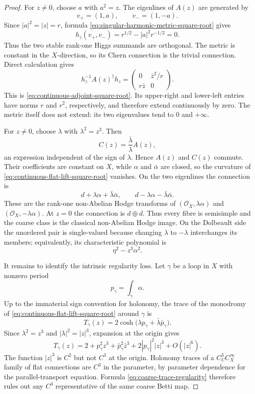 \documentclass[11pt,reqno]{amsart}
\theoremstyle{definition}
\theoremstyle{remark}
\begin{document}
\begin{proof}
For $z\ne0$, choose $a$ with $a^2=z$.  The eigenlines of $A(z)$ are generated by
\[
  v_+=(1,a),
  \qquad
  v_-=(1,-a).
\]
Since $|a|^2=|z|=r$, formula \eqref{eq:singular-harmonic-metric-square-root} gives
\[
  h_z(v_+,v_-)=r^{1/2}-|a|^2r^{-1/2}=0.
\]
Thus the two stable rank-one Higgs summands are orthogonal.  The metric is constant in the $X$-direction, so its Chern connection is the trivial connection.  Direct calculation gives
\[
  h_z^{-1}A(z)^\dagger h_z
  =
  \begin{pmatrix}
    0&\bar z^2/r\\
    r\bar z&0
  \end{pmatrix}.
\]
This is \eqref{eq:continuous-adjoint-square-root}.  Its upper-right and lower-left entries have norms $r$ and $r^2$, respectively, and therefore extend continuously by zero.  The metric itself does not extend: its two eigenvalues tend to $0$ and $+\infty$.

For $z\ne0$, choose $\lambda$ with $\lambda^2=z^3$.  Then
\[
  C(z)=\frac{\bar\lambda}{\lambda}A(z),
\]
an expression independent of the sign of $\lambda$.  Hence $A(z)$ and $C(z)$ commute.  Their coefficients are constant on $X$, while $\alpha$ and $\bar\alpha$ are closed, so the curvature of \eqref{eq:continuous-flat-lift-square-root} vanishes.  On the two eigenlines the connection is
\[
  d+\lambda\alpha+\bar\lambda\bar\alpha,
  \qquad
  d-\lambda\alpha-\bar\lambda\bar\alpha.
\]
These are the rank-one non-Abelian Hodge transforms of $(\mathcal O_X,\lambda\alpha)$ and $(\mathcal O_X,-\lambda\alpha)$.  At $z=0$ the connection is $d\oplus d$.  Thus every fibre is semisimple and the coarse class is the classical non-Abelian Hodge image.  On the Dolbeault side the unordered pair is single-valued because changing $\lambda$ to $-\lambda$ interchanges its members; equivalently, its characteristic polynomial is
\[
  \eta^2-z^3\alpha^2.
\]

It remains to identify the intrinsic regularity loss.  Let $\gamma$ be a loop in $X$ with nonzero period
\[
  p_\gamma=\int_\gamma\alpha.
\]
Up to the immaterial sign convention for holonomy, the trace of the monodromy of \eqref{eq:continuous-flat-lift-square-root} around $\gamma$ is
\[
  T_\gamma(z)
  =2\cosh\bigl(\lambda p_\gamma+\bar\lambda\bar p_\gamma\bigr).
\]
Since $\lambda^2=z^3$ and $|\lambda|^2=|z|^3$, expansion at the origin gives
\begin{equation}\label{eq:coarse-trace-regularity}
  T_\gamma(z)
  =2+p_\gamma^2z^3+\bar p_\gamma^2\bar z^3
   +2|p_\gamma|^2|z|^3+O(|z|^6).
\end{equation}
The function $|z|^3$ is $C^2$ but not $C^3$ at the origin.  Holonomy traces of a $C^3_UC^\infty_X$ family of flat connections are $C^3$ in the parameter, by parameter dependence for the parallel-transport equation.  Formula \eqref{eq:coarse-trace-regularity} therefore rules out any $C^3$ representative of the same coarse Betti map.
\end{proof}
\end{document}
